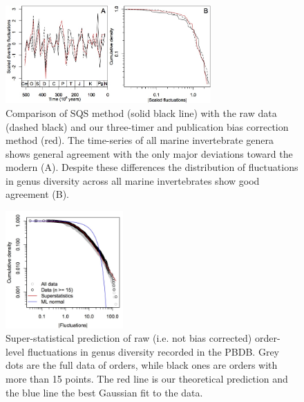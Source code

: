 \documentclass[12pt]{article}
\let\citep=\cite
\begin{document}
\begin{figure}[!hp]
  \centering
  \includegraphics[width=0.7\textwidth]{figs/figSupp_sqsRaw3tpub.jpg}
  \caption[Comparison of SQS method with the raw data and three-timer
  bias correction method]{Comparison of SQS method \citep{alroy2010}
    (solid black line) with the raw data (dashed black) and our
    three-timer and publication bias correction method (red). The
    time-series of all marine invertebrate genera shows general
    agreement with the only major deviations toward the modern
    (A). Despite these differences the distribution of fluctuations in
    genus diversity across all marine invertebrates show good
    agreement (B).}
  \label{fig:supp_3TPub}
\end{figure}

\begin{figure}[!hp]
  \centering
  \includegraphics[width=0.4\textwidth]{figs/figSupp_pbdbRaw_Px.jpg}
  \caption[Super-statistical prediction of raw data]{Super-statistical
    prediction of raw (i.e. not bias corrected) order-level
    fluctuations in genus diversity recorded in the PBDB. Grey dots
    are the full data of orders, while black ones are orders with more
    than 15 points. The red line is our theoretical prediction and the
    blue line the best Gaussian fit to the data.}
  \label{fig:supp_rawPBDB_Px}
\end{figure}
\end{document}
